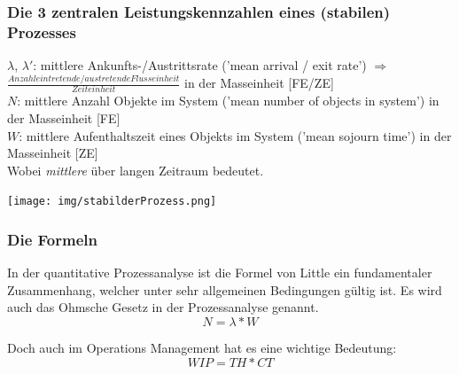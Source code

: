 \documentclass{report}
\newenvironment{Figure}
	{\par\medskip\noindent\minipage{\linewidth}}
	{\endminipage\par\medskip}
\theoremstyle{definition}
\theoremstyle{example}
\begin{document}
      \subsubsection{Die 3 zentralen Leistungskennzahlen eines (stabilen) Prozesses}
$\lambda$, $\lambda '$: mittlere Ankunfts-/Austrittsrate ('mean arrival / exit rate') $\Rightarrow$ $\frac{Anzahl eintretende / austretende Flusseinheit}{Zeiteinheit}$ in der Masseinheit [FE/ZE]\\
$N$: mittlere Anzahl Objekte im System ('mean number of objects in system') in der Masseinheit [FE]\\
$W$: mittlere Aufenthaltszeit eines Objekts im System ('mean sojourn time') in der Masseinheit [ZE]\\

Wobei \textit{mittlere} über langen Zeitraum bedeutet.

\begin{Figure}
\centering
\texttt{[image: img/stabilderProzess.png]}
	\label{fig:Abbildung eines stabilen Prozesses}
\end{Figure}

      \subsubsection{Die Formeln}
In der quantitative Prozessanalyse ist die Formel von Little ein fundamentaler Zusammenhang, welcher unter sehr allgemeinen Bedingungen gültig ist. Es wird auch das Ohmsche Gesetz in der Prozessanalyse genannt.
\begin{equation}
   N = \lambda * W
\end{equation}

Doch auch im Operations Management hat es eine wichtige Bedeutung:
\begin{equation}
   WIP = TH * CT
\end{equation}
\end{document}
